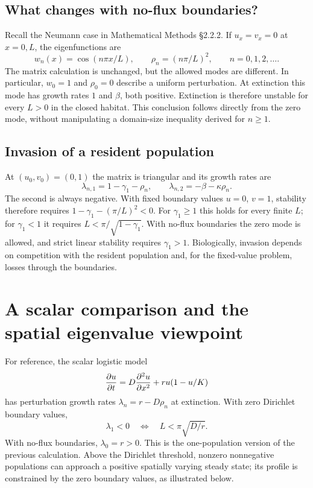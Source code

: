 \documentclass[main.tex]{subfiles}
\begin{document}
\subsection{What changes with no-flux boundaries?}
Recall the Neumann case in Mathematical Methods \S2.2.2. If $u_x=v_x=0$ at $x=0,L$, the eigenfunctions are
\begin{equation}\label{merged:neumannmodes}
w_n(x)=\cos(n\pi x/L),\qquad \rho_n=(n\pi/L)^2,
\qquad n=0,1,2,\ldots.
\end{equation}
The matrix calculation is unchanged, but the allowed modes are different. In particular, $w_0=1$ and $\rho_0=0$ describe a uniform perturbation. At extinction this mode has growth rates $1$ and $\beta$, both positive. Extinction is therefore unstable for every $L>0$ in the closed habitat. This conclusion follows directly from the zero mode, without manipulating a domain-size inequality derived for $n\geq1$.

\subsection{Invasion of a resident population}
At $(u_0,v_0)=(0,1)$ the matrix is triangular and its growth rates are
\begin{equation}
\lambda_{n,1}=1-\gamma_1-\rho_n,\qquad
\lambda_{n,2}=-\beta-\kappa\rho_n.
\end{equation}
The second is always negative. With fixed boundary values $u=0$, $v=1$, stability therefore requires
$1-\gamma_1-(\pi/L)^2<0$.
For $\gamma_1\geq1$ this holds for every finite $L$; for $\gamma_1<1$ it requires $L<\pi/\sqrt{1-\gamma_1}$. With no-flux boundaries the zero mode is allowed, and strict linear stability requires $\gamma_1>1$. Biologically, invasion depends on competition with the resident population and, for the fixed-value problem, losses through the boundaries.

\section{A scalar comparison and the spatial eigenvalue viewpoint}
For reference, the scalar logistic model
\begin{equation}\label{rd_eqn_logistic}
\pd{u}{t}=D\pdd{u}{x}+ru(1-u/K)
\end{equation}
has perturbation growth rates $\lambda_n=r-D\rho_n$ at extinction. With zero Dirichlet boundary values,
\begin{equation}\label{harsh_environment_growth}
\lambda_1<0\quad\Longleftrightarrow\quad L<\pi\sqrt{D/r}.
\end{equation}
With no-flux boundaries, $\lambda_0=r>0$. This is the one-population version of the previous calculation. Above the Dirichlet threshold, nonzero nonnegative populations can approach a positive spatially varying steady state; its profile is constrained by the zero boundary values, as illustrated below.
\end{document}
